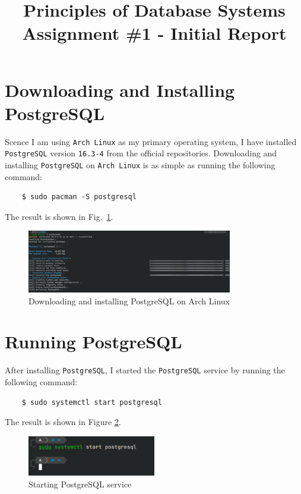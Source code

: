 \documentclass{cshwk}
\title{Principles of Database Systems\\Assignment \#1 - Initial Report}
\begin{document}
\maketitle

\section{Downloading and Installing PostgreSQL}
Scence I am using \texttt{Arch Linux} as my primary operating system, I have installed \texttt{PostgreSQL} version \texttt{16.3-4} from the official repositories. Downloading and installing \texttt{PostgreSQL} on \texttt{Arch Linux} is as simple as running the following command:
\begin{verbatim}
    $ sudo pacman -S postgresql
\end{verbatim}
The result is shown in Fig.~\ref{fig:install}.
\begin{figure}[htbp]
    \centering
    \includegraphics[width=0.8\textwidth]{hw1-1.png}
    \caption{Downloading and installing PostgreSQL on Arch Linux}
    \label{fig:install}
\end{figure}

\section{Running PostgreSQL}
After installing \texttt{PostgreSQL}, I started the \texttt{PostgreSQL} service by running the following command:
\begin{verbatim}
    $ sudo systemctl start postgresql
\end{verbatim}
The result is shown in Figure \ref{fig:start}.

\begin{figure}[htbp]
    \centering
    \includegraphics[width=0.5\textwidth]{hw1-2.png}
    \caption{Starting PostgreSQL service}
    \label{fig:start}
\end{figure}
\end{document}
